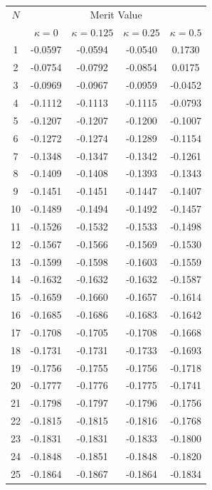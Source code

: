 \documentclass[11pt,letter,subeqn,fleqn]{article}
\newcommand{\ecc}{\kappa}
\begin{document}
\begin{table}[H]
\begin{center}
\begin{tabular}{| c | c | c | c | c |}
\hline
$N$    & \multicolumn{4}{c|}{Merit Value} \\
  & $\ecc = 0$ & $\ecc = 0.125$ & $\ecc = 0.25$ & $\ecc = 0.5$ \\
\hline
1 & -0.0597 & -0.0594 & -0.0540 & 0.1730 \\
2 & -0.0754 & -0.0792 & -0.0854 & 0.0175 \\
3 & -0.0969 & -0.0967 & -0.0959 & -0.0452 \\
4 & -0.1112 & -0.1113 & -0.1115 & -0.0793 \\
5 & -0.1207 & -0.1207 & -0.1200 & -0.1007 \\
6 & -0.1272 & -0.1274 & -0.1289 & -0.1154 \\
7 & -0.1348 & -0.1347 & -0.1342 & -0.1261 \\
8 & -0.1409 & -0.1408 & -0.1393 & -0.1343 \\
9 & -0.1451 & -0.1451 & -0.1447 & -0.1407 \\
10 & -0.1489 & -0.1494 & -0.1492 & -0.1457 \\
11 & -0.1526 & -0.1532 & -0.1533 & -0.1498 \\
12 & -0.1567 & -0.1566 & -0.1569 & -0.1530 \\
13 & -0.1599 & -0.1598 & -0.1603 & -0.1559 \\
14 & -0.1632 & -0.1632 & -0.1632 & -0.1587 \\
15 & -0.1659 & -0.1660 & -0.1657 & -0.1614 \\
16 & -0.1685 & -0.1686 & -0.1683 & -0.1642 \\
17 & -0.1708 & -0.1705 & -0.1708 & -0.1668 \\
18 & -0.1731 & -0.1731 & -0.1733 & -0.1693 \\
19 & -0.1756 & -0.1755 & -0.1756 & -0.1718 \\
20 & -0.1777 & -0.1776 & -0.1775 & -0.1741 \\
21 & -0.1798 & -0.1797 & -0.1796 & -0.1756 \\
22 & -0.1815 & -0.1815 & -0.1816 & -0.1768 \\
23 & -0.1831 & -0.1831 & -0.1833 & -0.1800 \\
24 & -0.1848 & -0.1851 & -0.1848 & -0.1820 \\
25 & -0.1864 & -0.1867 & -0.1864 & -0.1834 \\

\end{tabular}
\end{center}
\end{table}
\end{document}
